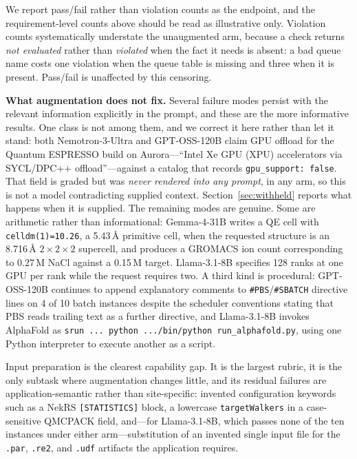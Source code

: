 \documentclass[conference]{IEEEtran}
\begin{document}
We report pass/fail rather than violation counts as the endpoint, and the requirement-level counts above should be read as illustrative only. Violation counts systematically understate the unaugmented arm, because a check returns \emph{not evaluated} rather than \emph{violated} when the fact it needs is absent: a bad queue name costs one violation when the queue table is missing and three when it is present. Pass/fail is unaffected by this censoring.

\textbf{What augmentation does not fix.} Several failure modes persist with the relevant information explicitly in the prompt, and these are the more informative results. One class is not among them, and we correct it here rather than let it stand: both Nemotron-3-Ultra and GPT-OSS-120B claim GPU offload for the Quantum ESPRESSO build on Aurora---``Intel Xe GPU (XPU) accelerators via SYCL/DPC++ offload''---against a catalog that records \texttt{gpu\_support: false}. That field is graded but was \emph{never rendered into any prompt}, in any arm, so this is not a model contradicting supplied context. Section~\ref{sec:withheld} reports what happens when it is supplied. The remaining modes are genuine. Some are arithmetic rather than informational: Gemma-4-31B writes a QE cell with \texttt{celldm(1)=10.26}, a 5.43\,\AA{} primitive cell, when the requested structure is an 8.716\,\AA{} $2\times2\times2$ supercell, and produces a GROMACS ion count corresponding to 0.27\,M NaCl against a 0.15\,M target. Llama-3.1-8B specifies 128 ranks at one GPU per rank while the request requires two. A third kind is procedural: GPT-OSS-120B continues to append explanatory comments to \texttt{\#PBS}/\texttt{\#SBATCH} directive lines on 4 of 10 batch instances despite the scheduler conventions stating that PBS reads trailing text as a further directive, and Llama-3.1-8B invokes AlphaFold as \texttt{srun ... python .../bin/python run\_alphafold.py}, using one Python interpreter to execute another as a script.

Input preparation is the clearest capability gap. It is the largest rubric, it is the only subtask where augmentation changes little, and its residual failures are application-semantic rather than site-specific: invented configuration keywords such as a NekRS \texttt{[STATISTICS]} block, a lowercase \texttt{targetWalkers} in a case-sensitive QMCPACK field, and---for Llama-3.1-8B, which passes none of the ten instances under either arm---substitution of an invented single input file for the \texttt{.par}, \texttt{.re2}, and \texttt{.udf} artifacts the application requires.
\end{document}
